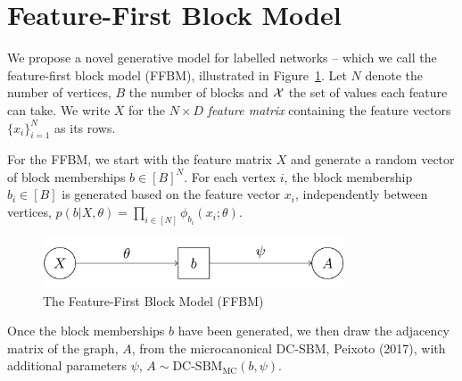 \section{Feature-First Block Model}

We propose a novel generative model for labelled networks -- which we call the feature-first block model (FFBM),
illustrated in Figure~\ref{fig:ffbm}.
%
Let $N$ denote the number of vertices, $B$ the number of blocks
and ${\cal X}$ the set of values each feature can take.
%
%
We write $X$ for the $N\times D$ {\em feature matrix} containing
the feature vectors $\{x_i\}_{i=1}^{N}$ 
as its rows.

For the FFBM, we start with the feature matrix $X$ and generate a random
vector of block memberships $b \in [B]^N$. For each vertex $i$, the
block membership $b_i\in[B]$ is generated based on the feature
vector $x_i$, independently between vertices, 
$p(b| X, \theta) = \prod_{i \in [N]} \phi_{b_i} (x_i; \theta)$.
%
%
%
%
\begin{figure}[!ht]
	\centering
%		
	\includegraphics[width=0.8\textwidth]{img/ffbm.png}
	\caption{The Feature-First Block Model (FFBM)}
	\label{fig:ffbm}
\end{figure}

Once the block memberships $b$ have been generated, we then draw the 
adjacency matrix of the graph, $A$, from the microcanonical DC-SBM, Peixoto (2017), with additional parameters 
$\psi$,
$
	A \sim \textrm{DC-SBM}_{\textrm{MC}} (b, \psi).
	\label{eqn:A-generation}
$
